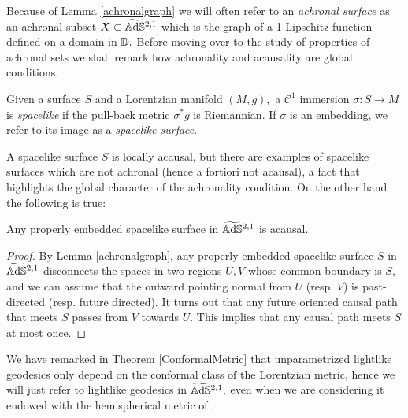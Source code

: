 Because of Lemma \ref{achronalgraph} we will often refer to an \textit{achronal surface} as an achronal subset $X\subset\widetilde{\mathbb{A}\mathrm{d}\mathbb{S}}{}^{2,1}$ which is the graph of a 1-Lipschitz function defined on a domain in $\mathbb{D}.$ Before moving over to the study of properties of achronal sets we shall remark how achronality and acausality are global conditions. 

\begin{definition} Given a surface $S$ and a Lorentzian manifold $(M,g),$ a $\mathcal{C}^1$ immersion $\sigma:S\to M$ is \textit{spacelike} if the pull-back metric $\sigma^*g$ is Riemannian. If $\sigma$ is an embedding, we refer to its image as a \textit{spacelike surface}.
\end{definition}

A spacelike surface $S$ is locally acausal, but there are examples of spacelike surfaces which are not achronal (hence a fortiori not acausal), a fact that highlights the global character of the achronality condition. On the other hand the following is true: 

\begin{lemma}\label{415}
    Any properly embedded spacelike surface in $\widetilde{\mathbb{A}\mathrm{d}\mathbb{S}}{}^{2,1}$ is acausal. 
\end{lemma}
\begin{proof}
    By Lemma \ref{achronalgraph}, any properly embedded spacelike surface $S$ in $\widetilde{\mathbb{A}\mathrm{d}\mathbb{S}}{}^{2,1}$ disconnects the spaces in two regions $U,V$ whose common boundary is $S$, and we can assume that the outward pointing normal from $U$ (resp. $V$) is past-directed (resp. future directed). It turns out that any future oriented causal path that meets $S$ passes from $V$ towards $U$. This implies that any causal path meets $S$ at most once.
\end{proof}

We have remarked in Theorem \ref{ConformalMetric} that unparametrized lightlike geodesics only depend on the conformal class of the Lorentzian metric, hence we will just refer to lightlike geodesics in $\widetilde{\mathbb{A}\mathrm{d}\mathbb{S}}{}^{2,1},$ even when we are considering it endowed with the hemispherical metric of . 


